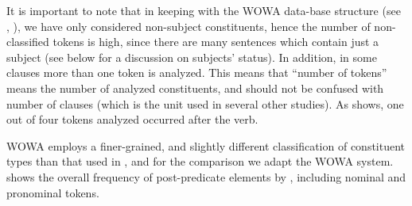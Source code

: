 \documentclass[output=paper,colorlinks,citecolor=brown,draftmode]{langscibook}
\begin{document}
\begin{table}
 \caption{Frequency of post-predicate elements in HamBam corpus (figures based on \citealt{Izadi2022Persian})}
 \label{Persian:tab:6}
\end{table}

It is important to note that in keeping with the WOWA data-base structure (see , ), we have only considered non-subject constituents, hence the number of non-classified tokens is high, since there are many sentences which contain just a subject (see below for a discussion on subjects' status). In addition, in some clauses more than one token is analyzed. This means that ``number of tokens'' means the number of analyzed constituents, and should not be confused with number of clauses (which is the unit used in several other studies). As  shows, one out of four tokens analyzed occurred after the verb.

WOWA employs a finer-grained, and slightly different classification of constituent types than that used in \citet{frommer_post-verbal_1981}, and for the comparison we adapt the WOWA system.  shows the overall frequency of post-predicate elements by , including nominal and pronominal tokens.
\end{document}
